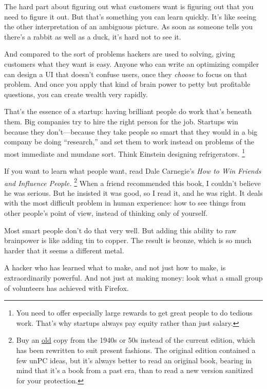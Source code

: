 \documentclass[12pt]{book}
\begin{document}
The hard part about figuring out what customers want is figuring out
that you need to figure it out. But that's something you can learn
quickly. It's like seeing the other interpretation of an ambiguous
picture. As soon as someone tells you there's a rabbit as well as a
duck, it's hard not to see it.

And compared to the sort of problems hackers are used to solving, giving
customers what they want is easy. Anyone who can write an optimizing
compiler can design a UI that doesn't confuse users, once they
\emph{choose} to focus on that problem. And once you apply that kind of
brain power to petty but profitable questions, you can create wealth
very rapidly.

That's the essence of a startup: having brilliant people do work that's
beneath them. Big companies try to hire the right person for the job.
Startups win because they don't---because they take people so smart that
they would in a big company be doing ``research,'' and set them to work
instead on problems of the most immediate and mundane sort. Think
Einstein designing refrigerators. \footnote{You need to offer especially large rewards to get great people
to do tedious work. That's why startups always pay equity rather than
just salary.}

If you want to learn what people want, read Dale Carnegie's \emph{How to
Win Friends and Influence People.} \footnote{Buy an
\href{http://dogbert.abebooks.com/servlet/SearchResults?bx=on&sts=t&ds=30&bi=0&an=carnegie&kn=1938+OR+1939+OR+1940+OR+1941+OR+1942+OR+1943+OR+1944+OR+1945+OR+1946+OR+1947+OR+1948&tn=influence+friends&sortby=2}{old}
copy from the 1940s or 50s instead of the current edition, which has
been rewritten to suit present fashions. The original edition contained
a few unPC ideas, but it's always better to read an original book,
bearing in mind that it's a book from a past era, than to read a new
version sanitized for your protection.} When a friend
recommended this book, I couldn't believe he was serious. But he
insisted it was good, so I read it, and he was right. It deals with the
most difficult problem in human experience: how to see things from other
people's point of view, instead of thinking only of yourself.

Most smart people don't do that very well. But adding this ability to
raw brainpower is like adding tin to copper. The result is bronze, which
is so much harder that it seems a different metal.

A hacker who has learned what to make, and not just how to make, is
extraordinarily powerful. And not just at making money: look what a
small group of volunteers has achieved with Firefox.
\end{document}
